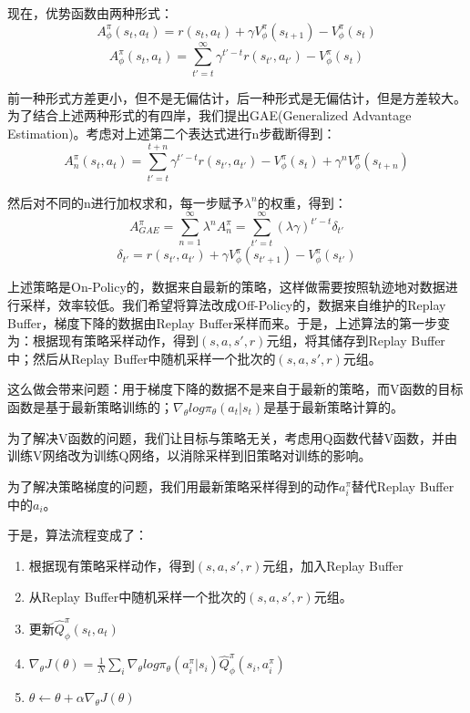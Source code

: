 \documentclass{article}
\theoremstyle{definition}
\begin{document}
\par 现在，优势函数由两种形式：
\[
A^{\pi}_{\phi}(s_t,a_t)=r(s_t,a_t)+\gamma V_{\phi}^{\pi}(s_{t+1})-V_{\phi}^{\pi}(s_t)
\]
\[
A^{\pi}_{\phi}(s_t,a_t)=\sum_{t'=t}^{\infty}\gamma^{t'-t}r(s_{t'},a_{t'})-V_{\phi}^{\pi}(s_t)
\]
\par 前一种形式方差更小，但不是无偏估计，后一种形式是无偏估计，但是方差较大。为了结合上述两种形式的有四岸，我们提出GAE(Generalized Advantage Estimation)。考虑对上述第二个表达式进行n步截断得到：
\[
A^{\pi}_{n}(s_t,a_t)=\sum_{t'=t}^{t+n}\gamma^{t'-t}r(s_{t'},a_{t'})-V_{\phi}^{\pi}(s_t)+\gamma^n V_{\phi}^{\pi}(s_{t+n})
\]
\par 然后对不同的n进行加权求和，每一步赋予$ \lambda^n $的权重，得到：
\[
A^{\pi}_{GAE}=\sum_{n=1}^{\infty}\lambda^n A^{\pi}_{n}=\sum_{t'=t}^{\infty}(\lambda \gamma)^{t'-t}\delta_{t'}
\]
\[
\delta_{t'}=r(s_{t'},a_{t'})+\gamma V^{\pi}_{\phi}(s_{t'+1})-V^{\pi}_{\phi}(s_{t'})
\]
\par 上述策略是On-Policy的，数据来自最新的策略，这样做需要按照轨迹地对数据进行采样，效率较低。我们希望将算法改成Off-Policy的，数据来自维护的Replay Buffer，梯度下降的数据由Replay Buffer采样而来。于是，上述算法的第一步变为：根据现有策略采样动作，得到$ (s,a,s',r) $元组，将其储存到Replay Buffer中；然后从Replay Buffer中随机采样一个批次的$ (s,a,s',r) $元组。
\par 这么做会带来问题：用于梯度下降的数据不是来自于最新的策略，而V函数的目标函数是基于最新策略训练的；$ \nabla_{\theta}log\pi_{\theta}(a_t|s_t) $是基于最新策略计算的。
\par 为了解决V函数的问题，我们让目标与策略无关，考虑用Q函数代替V函数，并由训练V网络改为训练Q网络，以消除采样到旧策略对训练的影响。
\par 为了解决策略梯度的问题，我们用最新策略采样得到的动作$ a_i^{\pi} $替代Replay Buffer中的$ a_i $。
\par 于是，算法流程变成了：
\begin{enumerate}
    \item 根据现有策略采样动作，得到$ (s,a,s',r) $元组，加入Replay Buffer
    \item 从Replay Buffer中随机采样一个批次的$ (s,a,s',r) $元组。
    \item 更新$ \hat{Q}_{\phi}^{\pi}(s_t,a_t) $
    \item $ \nabla_{\theta}J(\theta)=\frac{1}{N}\sum_i \nabla_{\theta}log\pi_{\theta}(a_i^{\pi}|s_i)\hat{Q}_{\phi}^{\pi}(s_i,a_i^{\pi}) $
    \item $ \theta\leftarrow\theta+\alpha\nabla_{\theta}J(\theta) $
\end{enumerate}
\end{document}
